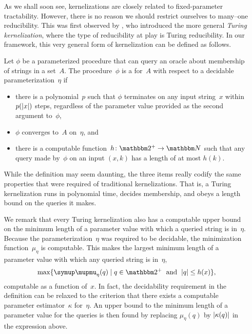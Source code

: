 As we shall soon see, kernelizations are closely related to fixed-parameter tractability.
However, there is no reason we should restrict ourselves to many--one reducibility.
This was first observed by \textcite{lokshtanov2009new}, who introduced the more general \emph{Turing kernelization}, where the type of reducibility at play is Turing reducibility.
In our framework, this very general form of kernelization can be defined as follows.
\begin{definition}
\label{def:turing_kernelization}%
  Let $\phi$ be a parameterized procedure that can query an oracle about membership of strings in a set~$A$.
  The procedure~$\phi$ is a  for~$A$ with respect to a decidable parameterization~$\eta$ if
  \begin{itemize}
  \item there is a polynomial~$p$ such that $\phi$ terminates on any input string~$x$ within $p({\lvert x\rvert})$ steps, regardless of the parameter value provided as the second argument to~$\phi$,
  \item $\phi$ converges to~$A$ on~$\eta$, and
  \item there is a computable function~$h\colon \binary^+ \to \bbN$ such that any query made by~$\phi$ on an input $(x, k)$ has a length of at most $h(k)$.
  \end{itemize}
\end{definition}
While the definition may seem daunting, the three items really codify the same properties that were required of traditional kernelizations.
That is, a Turing kernelization runs in polynomial time, decides membership, and obeys a length bound on the queries it makes.

We remark that every Turing kernelization also has a computable upper bound on the minimum length of a parameter value with which a queried string is in~$\eta$.
Because the parameterization~$\eta$ was required to be decidable, the minimization function~$\mu_\eta$ is computable.
This makes the largest minimum length of a parameter value with which any queried string is in~$\eta$,
\begin{equation*}
  \max \{\mu_\eta(q) \st q \in \binary^+ \reland \length{q} \le h(x)\},
\end{equation*}
computable as a function of~$x$.
In fact, the decidability requirement in the definition can be relaxed to the criterion that there exists a computable parameter estimator~$\kappa$ for~$\eta$.
An upper bound to the minimum length of a parameter value for the queries is then found by replacing $\mu_\eta(q)$ by ${\lvert\kappa(q)\rvert}$ in the expression above.

